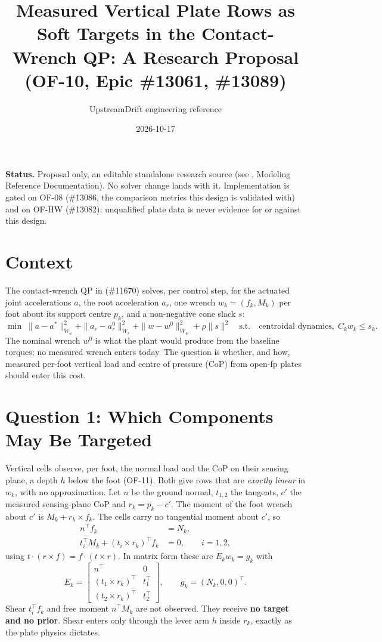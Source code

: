 \documentclass[11pt]{article}
\title{Measured Vertical Plate Rows as Soft Targets in the Contact-Wrench QP: A Research Proposal (OF-10, Epic \#13061, \#13089)}
\author{UpstreamDrift engineering reference}
\date{2026-10-17}
\begin{document}
\maketitle

\noindent\textbf{Status.} Proposal only, an editable standalone research
source (see , Modeling Reference Documentation). No solver
change lands with it. Implementation is gated on OF-08 (\#13086, the
comparison metrics this design is validated with) and on OF-HW (\#13082):
unqualified plate data is never evidence for or against this design.

\section{Context}

The contact-wrench QP in 
(\#11670) solves, per control step, for the actuated joint accelerations $a$,
the root acceleration $a_r$, one wrench $w_k = (f_k, M_k)$ per foot about its
support centre $p_k$, and a non-negative cone slack $s$:
\begin{equation}
  \min\; \|a-a^*\|^2_{W_a} + \|a_r-a_r^0\|^2_{W_r} + \|w-w^0\|^2_{W_w}
  + \rho\|s\|^2
  \quad\text{s.t.}\quad \text{centroidal dynamics},\; C_k w_k \le s_k .
\end{equation}
The nominal wrench $w^0$ is what the plant would produce from the baseline
torques; no measured wrench enters today. The question is whether, and how,
measured per-foot vertical load and centre of pressure (CoP) from open-fp
plates should enter this cost.

\section{Question 1: Which Components May Be Targeted}

Vertical cells observe, per foot, the normal load and the CoP on their
sensing plane, a depth $h$ below the foot (OF-11). Both give rows that are
\emph{exactly linear} in $w_k$, with no approximation. Let $n$ be the ground
normal, $t_{1,2}$ the tangents, $c'$ the measured sensing-plane CoP and
$r_k = p_k - c'$. The moment of the foot wrench about $c'$ is
$M_k + r_k \times f_k$. The cells carry no tangential moment about $c'$, so
\begin{align}
  n^\top f_k &= N_k, \\
  t_i^\top M_k + (t_i \times r_k)^\top f_k &= 0, \qquad i = 1, 2,
\end{align}
using $t\cdot(r\times f) = f\cdot(t\times r)$. In matrix form these are
$E_k w_k = g_k$ with
\begin{equation}
  E_k = \begin{bmatrix} n^\top & 0 \\ (t_1\times r_k)^\top & t_1^\top \\
  (t_2\times r_k)^\top & t_2^\top \end{bmatrix},\qquad
  g_k = (N_k, 0, 0)^\top .
\end{equation}
Shear $t_i^\top f_k$ and free moment $n^\top M_k$ are not observed. They
receive \textbf{no target and no prior}. Shear enters only through the lever
arm $h$ inside $r_k$, exactly as the plate physics dictates.
\end{document}

